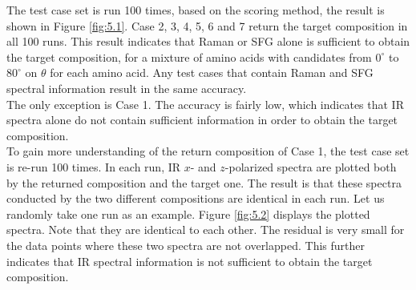 The test case set is run 100 times, based on the scoring method, the result is shown in 
Figure \ref{fig:5.1}. Case 2, 3, 4, 5, 6 and 7 return the target composition in all 100 runs. This result indicates that Raman or SFG alone is sufficient to obtain the target composition, for a mixture of amino acids with candidates from $0^{\circ}$ to $80^{\circ}$ on $\theta$ for each amino acid. Any test cases that contain Raman and SFG spectral information result in the same accuracy. \\

The only exception is Case 1. The accuracy is fairly low, which indicates that IR spectra alone do not contain sufficient information in order to obtain the target composition. \\

To gain more understanding of the return composition of Case 1, the test case set is re-run 100 times. In each run, IR $x$- and $z$-polarized spectra are plotted both by the returned composition and the target one. The result is that these spectra conducted by the two different compositions are identical in each run. Let us randomly take one run as an example. Figure \ref{fig:5.2} displays the plotted spectra. Note that they are identical to each other. The residual is very small for the data points where these two spectra are not overlapped. This further indicates that IR spectral information is not sufficient to obtain the target composition.\\


